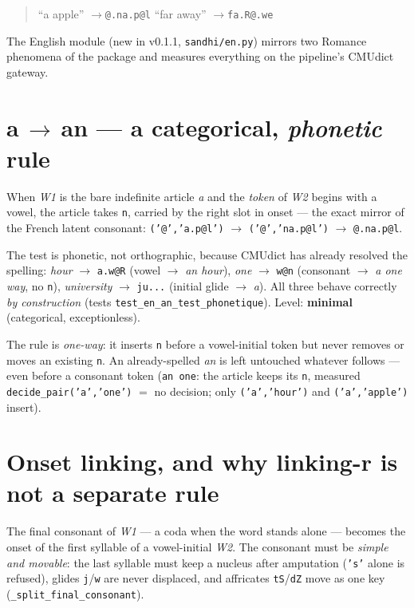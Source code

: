 \documentclass[11pt,a4paper]{report}
\newcommand{\smp}[1]{\texttt{#1}}          %
\begin{document}
\begin{quote}\large
``a apple'' \quad$\rightarrow$\quad \smp{@.na.p@l}\qquad
``far away'' \quad$\rightarrow$\quad \smp{fa.R@.we}
\end{quote}

\noindent The English module (new in v0.1.1, \smp{sandhi/en.py}) mirrors two
Romance phenomena of the package and measures everything on the pipeline's
CMUdict gateway.

\section{a\,$\rightarrow$\,an — a categorical, \emph{phonetic} rule}

When \emph{W1} is the bare indefinite article \emph{a} and the \emph{token}
of \emph{W2} begins with a vowel, the article takes \smp{n}, carried by the
right slot in onset — the exact mirror of the French latent consonant:
\smp{('@','a.p@l')} $\rightarrow$ \smp{('@','na.p@l')}
$\rightarrow$ \smp{@.na.p@l}.

The test is phonetic, not orthographic, because CMUdict has already resolved
the spelling: \emph{hour} $\rightarrow$ \smp{a.w@R} (vowel
$\rightarrow$ \emph{an hour}), \emph{one} $\rightarrow$ \smp{w@n} (consonant
$\rightarrow$ \emph{a one way}, no \smp{n}), \emph{university}
$\rightarrow$ \smp{ju...} (initial glide $\rightarrow$ \emph{a}). All three
behave correctly \emph{by construction} (tests
\smp{test\_en\_an\_test\_phonetique}). Level: \textbf{minimal}
(categorical, exceptionless).

The rule is \emph{one-way}: it inserts \smp{n} before a vowel-initial
token but never removes or moves an existing \smp{n}. An already-spelled
\emph{an} is left untouched whatever follows --- even before a consonant
token (\smp{an one}: the article keeps its \smp{n}, measured
\smp{decide\_pair('a','one')} $=$ no decision; only
\smp{('a','hour')} and \smp{('a','apple')} insert).

\section{Onset linking, and why linking-r is not a separate rule}

The final consonant of \emph{W1} — a coda when the word stands alone —
becomes the onset of the first syllable of a vowel-initial \emph{W2}. The
consonant must be \emph{simple and movable}: the last syllable must keep a
nucleus after amputation (\smp{'s'} alone is refused), glides \smp{j}/\smp{w}
are never displaced, and affricates \smp{tS}/\smp{dZ} move as one key
(\smp{\_split\_final\_consonant}).
\end{document}
